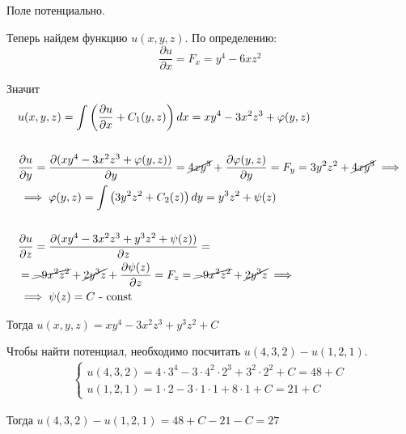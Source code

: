 \documentclass{report}
\newcommand*\partialofby[2]{\frac{\partial #1}{\partial #2}}
\begin{document}
Поле потенциально.


Теперь найдем функцию $u(x, y, z)$.
По определению:
$$
    \partialofby{u}{x} = F_x = y^4 - 6xz^2
$$

Значит
\begin{align*}
     & u(x, y, z) = \int \left( \partialofby{u}{x} + C_1(y, z) \right)dx = xy^4 - 3x^2z^3 + \varphi(y, z)                                                                \\
     &                                                                                                                                                                   \\
     & \partialofby{u}{y} = \partialofby{(xy^4 - 3x^2z^3 + \varphi(y, z))}{y} = \cancel{4xy^3} + \partialofby{\varphi(y,z)}{y} = F_y = 3y^2z^2 + \cancel{4xy^3} \implies \\
     & \implies \varphi(y, z) = \int \left( 3y^2z^2 + C_2(z) \right)dy = y^3z^2 + \psi(z)                                                                                \\
     &                                                                                                                                                                   \\
     & \partialofby{u}{z} = \partialofby{(xy^4 - 3x^2z^3 + y^3z^2 + \psi(z))}{z} =                                                                                       \\
     & = \cancel{-9x^2z^2} + \cancel{2y^3z} + \partialofby{\psi(z)}{z} = F_z = \cancel{-9x^2z^2} + \cancel{2y^3z} \implies                                               \\
     & \implies \psi(z) = C \mbox{ - const}
\end{align*}

Тогда $u(x, y, z) = xy^4 - 3x^2z^3 + y^3z^2 + C$

Чтобы найти потенциал, необходимо посчитать $u(4, 3 , 2) - u(1, 2, 1)$.
\begin{align*}
    \begin{cases}
        u(4, 3 , 2) = 4 \cdot 3^4 - 3 \cdot 4^2 \cdot 2^3 + 3^2 \cdot 2^2 + C = 48 + C \\
        u(1, 2, 1) = 1 \cdot 2 - 3 \cdot 1 \cdot 1 + 8 \cdot 1 + C = 21 + C
    \end{cases}
\end{align*}

Тогда $u(4, 3 , 2) - u(1, 2, 1) = 48 + C - 21 - C = 27$
\end{document}
